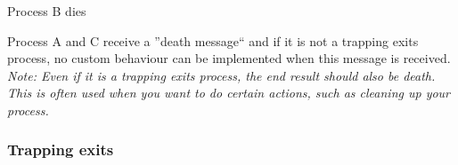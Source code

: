 \begin{frame}
\begin{overprint}
        \begin{center}
            Process B dies
        \end{center}

        Process A and C receive a ''death message`` and if it is not a trapping exits process, no custom behaviour can be implemented when this message is received.
        \vfill
        \textit{Note: Even if it is a trapping exits process, the end result should also be death.
            This is often used when you want to do certain actions, such as cleaning up your process.}
    \end{overprint}
\end{frame}

\begin{frame}
    \frametitle{Trapping exits}
    \begin{center}
    \end{center}
\end{frame}
